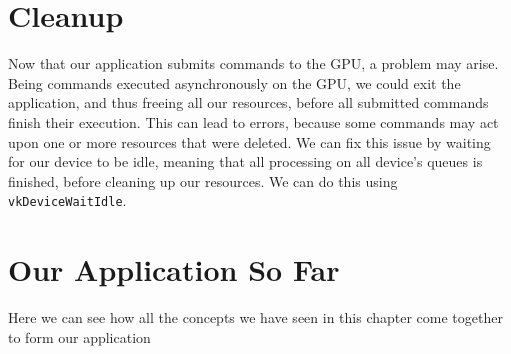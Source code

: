 \begin{minipage}{\linewidth}{\noindent}
    
\end{minipage}

\section{Cleanup}

Now that our application submits commands to the GPU, a problem may arise.
Being commands executed asynchronously on the GPU, we could exit the application,
and thus freeing all our resources, before all submitted commands finish
their execution.
This can lead to errors, because some commands may act upon one or more resources
that were deleted.
We can fix this issue by waiting for our device to be idle, meaning that
all processing on all device's queues is finished, before cleaning up our resources.
We can do this using \texttt{vkDeviceWaitIdle}.

\section{Our Application So Far}

Here we can see how all the concepts we have seen in this chapter come together
to form our application

\begin{minipage}{\linewidth}{\noindent}
    
\end{minipage}

